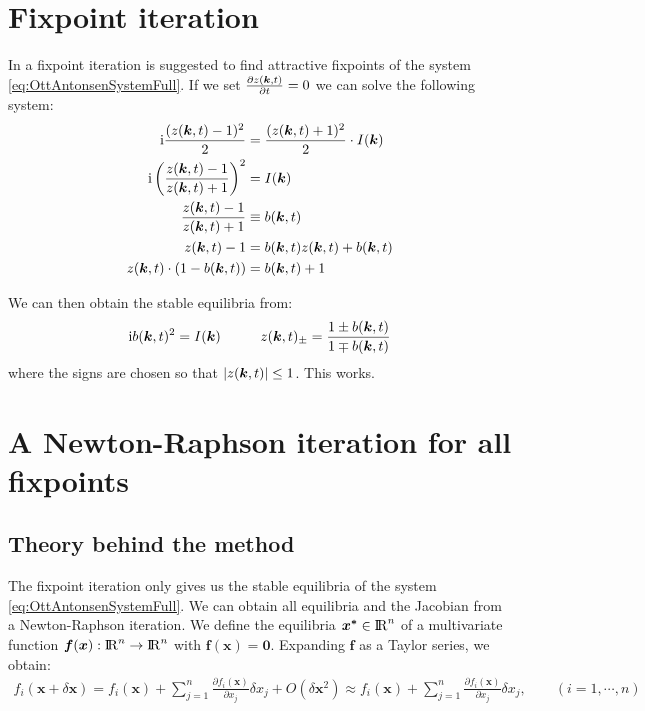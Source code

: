 \section{Fixpoint iteration}
In \cite{OttAntonsen2017} a fixpoint iteration is suggested to find attractive fixpoints of the system \eqref{eq:OttAntonsenSystemFull}. If we set $\frac{\partial z({\boldsymbol{k}}, t)}{\partial t} = 0$ we can solve the following system:
\begin{align}
{\rm{i}} \frac{(z({\boldsymbol{k}}, t)-1)^{2}}{2} &= \frac{(z({\boldsymbol{k}}, t)+1)^{2}}{2} \cdot I({\boldsymbol{k}}) \nonumber \\
{\rm{i}} \left(\frac{z({\boldsymbol{k}}, t)-1}{z({\boldsymbol{k}}, t)+1}\right)^2 &= I({\boldsymbol{k}}) \nonumber \\
\frac{z({\boldsymbol{k}}, t)-1}{z({\boldsymbol{k}}, t)+1} &\equiv b({\boldsymbol{k}},t) \nonumber \\
z({\boldsymbol{k}}, t) - 1 &= b({\boldsymbol{k}},t) z({\boldsymbol{k}}, t) + b({\boldsymbol{k}},t)  \nonumber \\
z({\boldsymbol{k}}, t) \cdot (1 - b({\boldsymbol{k}},t)) &= b({\boldsymbol{k}},t)  + 1\nonumber
\end{align}

We can then obtain the stable equilibria from:
\begin{align}
\ic b(\k,t)^2 = I(\k) \hspace{10mm} z(\k, t)_{\pm} = \frac{1 \pm b(\k,t)}{1 \mp b(\k,t)} \label{eq:fixedpointiterations} 
\end{align}
where the signs are chosen so that $\vert z({\boldsymbol{k}}, t) \vert \leq 1$. This works.


\section{A Newton-Raphson iteration for all fixpoints}
\subsection{Theory behind the method}
The fixpoint iteration only gives us the stable equilibria of the system \eqref{eq:OttAntonsenSystemFull}. We can obtain all equilibria and the Jacobian from a Newton-Raphson iteration. We define the equilibria $\boldsymbol{x^\ast} \in {\rm I\!R}^n$ of a multivariate function $\boldsymbol{f}(\boldsymbol{x}) : {\rm I\!R}^n \rightarrow {\rm I\!R}^n$ with $\boldsymbol{f}(\boldsymbol{x}) = \boldsymbol{0}$. Expanding $\boldsymbol{f}$ as a Taylor series, we obtain:
\begin{align}
f_i(\boldsymbol{x} + \delta \boldsymbol{x}) =f_{i}(\boldsymbol{x}) + \sum_{j=1}^{n} \frac{\partial f_{i}(\boldsymbol{x})}{\partial x_{j}} \delta x_{j}+O\left(\delta \boldsymbol{x}^{2}\right) \approx f_{i}(\boldsymbol{x})+\sum_{j=1}^{n} \frac{\partial f_{i}(\boldsymbol{x})}{\partial x_{j}} \delta x_{j}, \qquad (i=1, \cdots, n)
\end{align}

